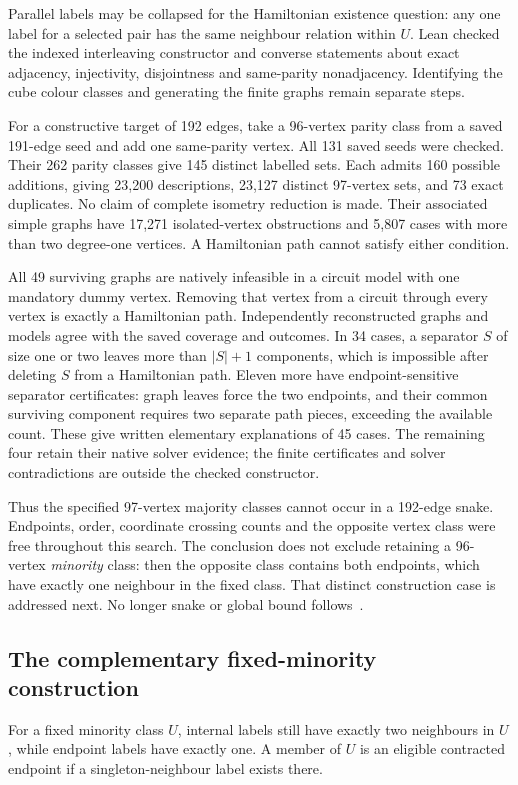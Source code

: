 \documentclass[11pt,a4paper]{article}
\theoremstyle{definition}
\theoremstyle{remark}
\begin{document}
Parallel labels may be collapsed for the Hamiltonian existence question:
any one label for a selected pair has the same neighbour relation within
$U$. Lean checked the indexed interleaving constructor and converse
statements about exact adjacency, injectivity, disjointness and
same-parity nonadjacency. Identifying the cube colour classes and
generating the finite graphs remain separate steps.

For a constructive target of 192 edges, take a 96-vertex parity class
from a saved 191-edge seed and add one same-parity vertex. All 131 saved
seeds were checked. Their 262 parity classes give 145 distinct labelled
sets. Each admits 160 possible additions, giving 23,200 descriptions,
23,127 distinct 97-vertex sets, and 73 exact duplicates. No claim of
complete isometry reduction is made. Their associated simple graphs have
17,271 isolated-vertex obstructions and 5,807 cases with more than two
degree-one vertices. A Hamiltonian path cannot satisfy either condition.

All 49 surviving graphs are natively infeasible in a circuit model with
one mandatory dummy vertex. Removing that vertex from a circuit through
every vertex is exactly a Hamiltonian path. Independently reconstructed
graphs and models agree with the saved coverage and outcomes. In 34 cases,
a separator $S$ of size one or two leaves more than $|S|+1$ components,
which is impossible after deleting $S$ from a Hamiltonian path. Eleven
more have endpoint-sensitive separator certificates: graph leaves force
the two endpoints, and their common surviving component requires two
separate path pieces, exceeding the available count.
These give written elementary explanations of 45 cases. The remaining
four retain their native solver evidence; the finite certificates and
solver contradictions are outside the checked constructor.

Thus the specified 97-vertex majority classes cannot occur in a
192-edge snake. Endpoints, order, coordinate crossing counts and the
opposite vertex class were free throughout this search. The conclusion
does not exclude retaining a 96-vertex \emph{minority} class: then the
opposite class contains both endpoints, which have exactly one neighbour
in the fixed class. That distinct construction case is addressed next.
No longer snake or global bound follows~\cite{research231}.

\subsection{The complementary fixed-minority construction}
\label{sec:minority232}
For a fixed minority class $U$, internal labels still have exactly two
neighbours in $U$, while endpoint labels have exactly one. A member of
$U$ is an eligible contracted endpoint if a singleton-neighbour label
exists there.
\end{document}
